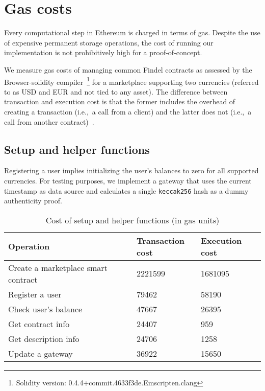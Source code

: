 
\section{Gas costs} \label{sec:Ch10FindelTesting}

Every computational step in Ethereum is charged in terms of gas.
Despite the use of expensive permanent storage operations, the cost of running our implementation is not prohibitively high for a proof-of-concept.

We measure gas costs of managing common Findel contracts as assessed by the Browser-solidity compiler~\cite{BrowserSolidity}\footnote{Solidity version: 0.4.4+commit.4633f3de.Emscripten.clang} for a marketplace supporting two currencies (referred to as USD and EUR and not tied to any asset).
The difference between transaction and execution cost is that the former includes the overhead of creating a transaction (i.e.,~a call from a client) and the latter does not (i.e.,~a call from another contract)~\cite{Revere2016}.

\subsection{Setup and helper functions}

Registering a user implies initializing the user's balances to zero for all supported currencies.
For testing purposes, we implement a gateway that uses the current timestamp as data source and calculates a single \texttt{keccak256} hash as a dummy authenticity proof.

\begin{table}
	\centering
	\begin{tabular}{| p{0.5\linewidth} | p{0.25\linewidth} | p{0.25\linewidth} |}
		\hline
		\textbf{Operation} & \textbf{Transaction cost} & \textbf{Execution cost} \\
		\hline
		Create a marketplace smart contract & 2221599 & 1681095 \\
		\hline
		Register a user & 79462 & 58190 \\
		\hline
		Check user's balance & 47667 & 26395 \\
		\hline
		Get contract info & 24407 & 959 \\
		\hline
		Get description info & 24706 & 1258 \\
		\hline
		Update a gateway & 36922 & 15650 \\
		\hline
	\end{tabular}
	\caption{Cost of setup and helper functions (in gas units)}
	\label{tab:Ch10FindelCost}
\end{table}


